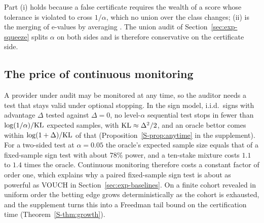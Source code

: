Part (i) holds because a false certificate requires the wealth of a score whose tolerance
is violated to cross $1/\alpha$, which no union over the class changes; (ii) is the merging
of e-values by averaging \citep{vovk2021evalues}. The union audit of
Section~\ref{sec:exp-squeeze} splits $\alpha$ on both sides and is therefore conservative on
the certificate side.

\subsection{The price of continuous monitoring}\label{sec:anytime}

A provider under audit may be monitored at any time, so the auditor needs a test that stays
valid under optional stopping. In the sign model, i.i.d.\ signs with advantage $\Delta$ tested
against $\Delta=0$, no level-$\alpha$ sequential test stops in fewer than
$\log(1/\alpha)/\mathrm{KL}$ expected samples, with $\mathrm{KL}\approx\Delta^2/2$, and an oracle bettor comes
within $\log(1+\Delta)/\mathrm{KL}$ of that (Proposition~\ref{S-prop:anytime} in the supplement). For a
two-sided test at $\alpha=0.05$ the oracle's expected sample size equals that of a
fixed-sample sign test with about $78\%$ power, and a ten-stake mixture costs $1.1$ to $1.4$
times the oracle. Continuous monitoring therefore costs a constant factor of order one, which
explains why a paired fixed-sample sign test is about as powerful as VOUCH in
Section~\ref{sec:exp-baselines}. On a finite cohort revealed in uniform order the betting edge
grows deterministically as the cohort is exhausted, and the supplement turns this into a
Freedman tail bound on the certification time (Theorem~\ref{S-thm:growth}).
